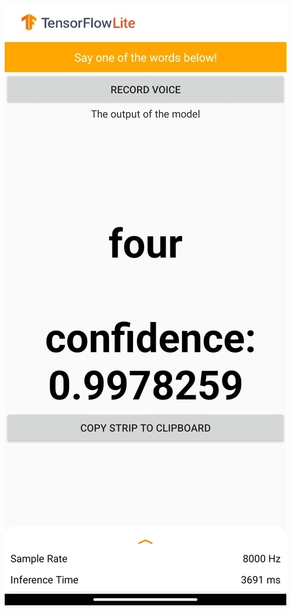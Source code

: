 \documentclass{report}
\theoremstyle{definition}
\theoremstyle{remark}
\begin{document}
\begin{minipage}{\textwidth}
\begin{minipage}{.5\textwidth}
    \centering
    \includegraphics[scale=0.1]{img/app.jpg}

\end{minipage}
\end{minipage}
\end{document}
